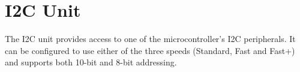 

\section{I2C Unit}

The I2C unit provides access to one of the microcontroller's I2C peripherals. It can be configured to use either of the three speeds (Standard, Fast and Fast+) and supports both 10-bit and 8-bit addressing.
